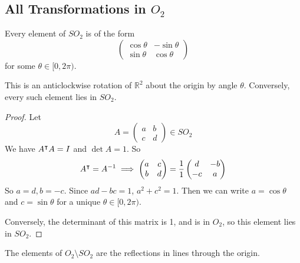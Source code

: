 \subsection{All Transformations in \(O_2\)}
\begin{theorem}
	Every element of \(SO_2\) is of the form
	\[
		\begin{pmatrix}
			\cos\theta & -\sin\theta \\
			\sin\theta & \cos\theta
		\end{pmatrix}
	\]
	for some \(\theta \in [0, 2\pi)\).
	
	This is an anticlockwise rotation of \(\mathbb R^2\) about the origin by angle \(\theta\).
	Conversely, every such element lies in \(SO_2\).
\end{theorem}
\begin{proof}
	Let
	\[
		A = \begin{pmatrix}
			a & b \\ c & d
		\end{pmatrix} \in SO_2
	\]
	We have \(A^\intercal A = I\) and \(\det A = 1\).
	So
	\[
		A^\intercal = A^{-1} \implies \begin{pmatrix}
			a & c \\ b & d
		\end{pmatrix} = \frac{1}{1} \begin{pmatrix}
			d & -b \\ -c & a
		\end{pmatrix}
	\]
	So \(a=d, b=-c\).
	Since \(ad-bc=1\), \(a^2+c^2=1\).
	Then we can write \(a = \cos \theta\) and \(c = \sin \theta\) for a unique \(\theta \in [0, 2\pi)\).
	
	Conversely, the determinant of this matrix is 1, and is in \(O_2\), so this element lies in \(SO_2\).
\end{proof}
\begin{theorem}
	The elements of \(O_2 \setminus SO_2\) are the reflections in lines through the origin.
\end{theorem}
